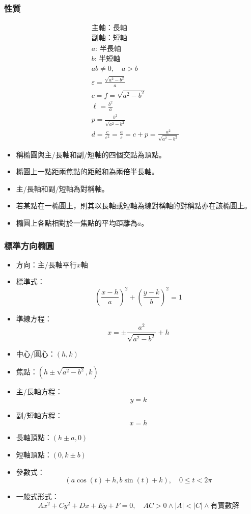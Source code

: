 \documentclass[a4paper,12pt]{article}
\begin{document}
\subsubsection{性質}
\[\begin{aligned}
&\text{主軸：長軸}\\
&\text{副軸：短軸}\\
&a:\,\text{半長軸}\\
&b:\,\text{半短軸}\\
&ab\neq 0,\quad a>b\\
&\varepsilon=\frac{\sqrt{a^2-b^2}}{a}\\
&c=f=\sqrt{a^2-b^2}\\
&\ell=\frac{b^2}{a}\\
&p=\frac{b^2}{\sqrt{a^2-b^2}}\\
&d=\frac{c}{\varepsilon^2}=\frac{a}{\varepsilon}=c+p=\frac{a^2}{\sqrt{a^2-b^2}}
\end{aligned}\]
\begin{itemize}
\item 稱橢圓與主/長軸和副/短軸的四個交點為頂點。
\item 橢圓上一點距兩焦點的距離和為兩倍半長軸。
\item 主/長軸和副/短軸為對稱軸。
\item 若某點在一橢圓上，則其以長軸或短軸為線對稱軸的對稱點亦在該橢圓上。
\item 橢圓上各點相對於一焦點的平均距離為$a$。
\end{itemize}
\subsubsection{標準方向橢圓}
\begin{itemize}
\item 方向：主/長軸平行$x$軸
\item 標準式：
\[\left(\frac{x-h}{a}\right)^2+\left(\frac{y-k}{b}\right)^2=1\]
\item 準線方程：
\[x=\pm\frac{a^2}{\sqrt{a^2-b^2}}+h\]
\item 中心/圓心：$(h,k)$
\item 焦點：$(h\pm\sqrt{a^2-b^2},k)$
\item 主/長軸方程：
\[y=k\]
\item 副/短軸方程：
\[x=h\]
\item 長軸頂點：$(h\pm a,0)$
\item 短軸頂點：$(0,k\pm b)$
\item 參數式：
\[(a\cos(t)+h,b\sin(t)+k),\quad0\leq t<2\pi\]
\item 一般式形式：
\[Ax^2+Cy^2+Dx+Ey+F=0,\quad AC>0\land |A|<|C|\land\text{有實數解}\]
\end{itemize}
\end{document}
